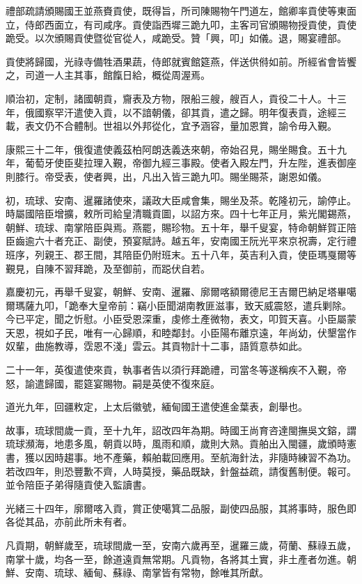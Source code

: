 \begin{pinyinscope}
禮部疏請頒賜國王並燕賚貢使，既得旨，所司陳賜物午門道左，館卿率貢使等東面立，侍郎西面立，有司咸序。貢使詣西墀三跪九叩，主客司官頒賜物授貢使，貢使跪受。以次頒賜貢使暨從官從人，咸跪受。贊「興，叩」如儀。退，賜宴禮部。

貢使將歸國，光祿寺備牲酒果蔬，侍郎就賓館筵燕，伴送供偫如前。所經省會皆饗之，司道一人主其事，館餼日給，概從周渥焉。

順治初，定制，諸國朝貢，齎表及方物，限船三艘，艘百人，貢役二十人。十三年，俄國察罕汗遣使入貢，以不諳朝儀，卻其貢，遣之歸。明年復表貢，途經三載，表文仍不合體制。世祖以外邦從化，宜予涵容，量加恩賞，諭令毋入覲。

康熙三十二年，俄復遣使義茲柏阿朗迭義迭來朝，帝始召見，賜坐賜食。五十九年，葡萄牙使臣斐拉理入覲，帝御九經三事殿。使者入殿左門，升左陛，進表御座則膝行。帝受表，使者興，出，凡出入皆三跪九叩。賜坐賜茶，謝恩如儀。

初，琉球、安南、暹羅諸使來，議政大臣咸會集，賜坐及茶。乾隆初元，諭停止。時屬國陪臣增擴，敕所司給皇清職貢圖，以詔方來。四十七年正月，紫光閣錫燕，朝鮮、琉球、南掌陪臣與焉。燕罷，賜珍物。五十年，舉千叟宴，特命朝鮮賀正陪臣齒逾六十者充正、副使，預宴賦詩。越五年，安南國王阮光平來京祝壽，定行禮班序，列親王、郡王間，其陪臣仍附班末。五十八年，英吉利入貢，使臣瑪戛爾等覲見，自陳不習拜跪，及至御前，而跽伏自若。

嘉慶初元，再舉千叟宴，朝鮮、安南、暹羅、廓爾喀額爾德尼王吉爾巴納足塔畢噶爾瑪薩九叩，「跪奉大皇帝前：竊小臣聞湖南教匪滋事，致天威震怒，遣兵剿除。今已平定，聞之忻慰。小臣受恩深重，虔修土產微物，表文，叩賀天喜。小臣屬蒙天恩，視如子民，唯有一心歸順，和睦鄰封。小臣陽布離京遠，年尚幼，伏墾當作奴輩，曲施教導，霑恩不淺」雲云。其貢物計十二事，語質意恭如此。

二十一年，英復遣使來貢，執事者告以須行拜跪禮，司當冬等遂稱疾不入覲，帝怒，諭遣歸國，罷筵宴賜物。嗣是英使不復來庭。

道光九年，回疆敉定，上太后徽號，緬甸國王遣使進金葉表，創舉也。

故事，琉球間歲一貢，至十九年，詔改四年為期。時國王尚育咨達閩撫吳文鎔，謂琉球瀕海，地患多風，朝貢以時，風雨和順，歲則大熟。貢舶出入閩疆，歲頒時憲書，獲以因時趨事。地不產藥，賴舶載回應用。至航海針法，非隨時練習不為功。若改四年，則恐豐歉不齊，人時莫授，藥品既缺，針盤益疏，請復舊制便。報可。並令陪臣子弟得隨貢使入監讀書。

光緒三十四年，廓爾喀入貢，賞正使噶箕二品服，副使四品服，其將事時，服色即各從其品，亦前此所未有者。

凡貢期，朝鮮歲至，琉球間歲一至，安南六歲再至，暹羅三歲，荷蘭、蘇祿五歲，南掌十歲，均各一至，餘道遠貢無常期。凡貢物，各將其土實，非土產者勿進。朝鮮、安南、琉球、緬甸、蘇祿、南掌皆有常物，餘唯其所獻。


\end{pinyinscope}
